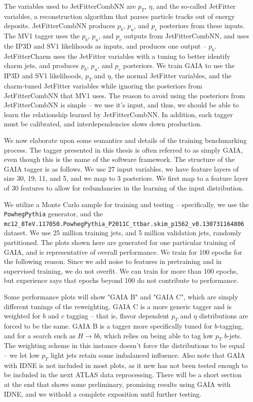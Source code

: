 The variables used to JetFitterCombNN are $p_T$, $\eta$, and the so-called JetFitter variables, a reconstruction algorithm that parses particle tracks out of energy deposits. JetFitterCombNN produces $p_b$, $p_u$, and $p_c$ posteriors from these inputs. The MV1 tagger uses the $p_b$, $p_u$, and $p_c$ outputs from JetFitterCombNN, and uses the IP3D and SV1 likelihoods as inputs, and produces one output -- $p_b$. JetFitterCharm uses the JetFitter variables with a tuning to better identify charm jets, and produces $p_b$, $p_u$, and $p_c$ posteriors. We train GAIA to use the IP3D and SV1 likelihoods, $p_T$ and $\eta$, the normal JetFitter variables, and the charm-tuned JetFitter variables while ignoring the posteriors from JetFitterCombNN that MV1 uses. The reason to avoid using the posteriors from JetFitterCombNN is simple -- we use it's input, and thus, we should be able to learn the relationship learned by JetFitterCombNN. In addition, each tagger must be calibrated, and interdependencies slows down production.  

We now elaborate upon some semantics and details of the training benchmarking process. The tagger presented in this thesis is often referred to as simply GAIA, even though this is the name of the software framework. The structure of the GAIA tagger is as follows. We use 27 input variables, we have feature layers of size 30, 19, 11, and 5, and we map to 3 posteriors. We first map to a feature layer of 30 features to allow for redundancies in the learning of the input distribution. 

We utilize a Monte Carlo sample for training and testing -- specifically, we use the \texttt{PowhegPythia} generator, and the \texttt{mc12\_8TeV.117050.PowhegPythia\_P2011C\_ttbar.skim\_p1562\_v0.130731164806} dataset. We use 25 million training jets, and 5 million validation jets, randomly partitioned. The plots shown here are generated for one particular training of GAIA, and is representative of overall performance. We train for  100 epochs for the following reason. Since we add noise to features in pretraining and in supervised training, we do not overfit. We can train for more than 100 epochs, but experience says that epochs beyond 100 do not contribute to performance.

Some performance plots will show "GAIA B" and "GAIA C", which are simply different tunings of the reweighting. GAIA C is a more generic tagger and is weighted for $b$ and $c$ tagging -- that is, flavor dependent $p_T$ and $\eta$ distributions are forced to be the same. GAIA B is a tagger more specifically tuned for $b$-tagging, and for a search such as $H\longrightarrow bb$, which relies on being able to tag low $p_T$ $b$-jets. The weighting scheme in this instance doesn't force the distributions to be equal -- we let low $p_T$ light jets retain some imbalanced influence. Also note that GAIA with IDNE is not included in most plots, as it new has not been tested enough to be included in the next ATLAS data reprocessing. There will be a short section at the end that shows some preliminary, promising results using GAIA with IDNE, and we withold a complete exposition until further testing. 


